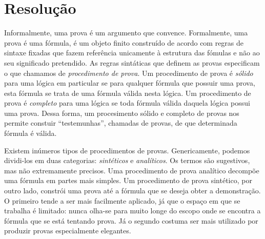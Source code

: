 

\section{Resolução}
\label{sec:resolucao}
Informalmente, uma prova é um argumento que convence. Formalmente, uma prova é
uma fórmula, é um objeto finito construído de acordo com regras de sintaxe
fixadas que fazem referência unicamente à estrutura das fómulas e não ao seu
significado pretendido. As regras sintáticas que definem as provas especificam o
que chamamos de \textit{procedimento de prova}.
Um procedimento de prova é \textit{sólido} para uma lógica em particular se
para qualquer fórmula que possuir uma prova, esta fórmula se trata de uma
fórmula válida nesta lógica. Um procedimento de prova é \textit{completo} para
uma lógica se toda fórmula válida daquela lógica possui uma prova. Dessa forma,
um procesimento sólido e completo de provas nos permite constuir
``testemunhas'', chamadas de provas, de que determinada fórmula é válida.

Existem inúmeros tipos de procedimentos de provas. Genericamente, podemos
dividi-los em duas categorias: \textit{sintéticos} e \textit{analíticos}. Os
termos são sugestivos, mas não extremamente precisos. Uma procedimento de prova
analítico decompõe uma fórmula em partes mais simples. Um procedimento de prova
sintético, por outro lado, constrói uma prova até a fórmula que se deseja obter a
demonstração.
O primeiro tende a ser mais facilmente aplicado, já que o espaço em que se
trabalha é limitado: nunca olha-se para muito longe do escopo onde se encontra a
fórmula que se está tentando prova. Já o segundo costuma ser mais utilizado por
produzir provas especialmente elegantes.

